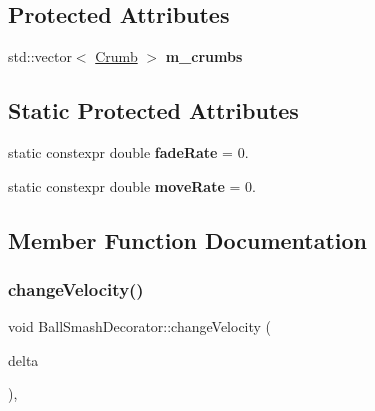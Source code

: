 \subsection*{Protected Attributes}
\begin{DoxyCompactItemize}
\item 
\mbox{\label{class_ball_smash_decorator_af9860ac78866ac55c8548b7fd8581610}} 
std\+::vector$<$ \mbox{\hyperlink{struct_ball_smash_decorator_1_1_crumb}{Crumb}} $>$ {\bfseries m\+\_\+crumbs}
\end{DoxyCompactItemize}
\subsection*{Static Protected Attributes}
\begin{DoxyCompactItemize}
\item 
\mbox{\label{class_ball_smash_decorator_aeef9438a9102847ca841bc657605e88b}} 
static constexpr double {\bfseries fade\+Rate} = 0.
\item 
\mbox{\label{class_ball_smash_decorator_a947a58aafc3f976931a532974d89abe0}} 
static constexpr double {\bfseries move\+Rate} = 0.
\end{DoxyCompactItemize}


\subsection{Member Function Documentation}
\mbox{\label{class_ball_smash_decorator_ad59848156e8eabad3e561a1d113f7029}} 
\subsubsection{\texorpdfstring{change\+Velocity()}{changeVelocity()}}
{\footnotesize\ttfamily void Ball\+Smash\+Decorator\+::change\+Velocity (\begin{DoxyParamCaption}\item[{const Q\+Vector2D \&}]{delta }\end{DoxyParamCaption})\hspace{0.3cm}{\ttfamily [override]}, {\ttfamily [virtual]}}



